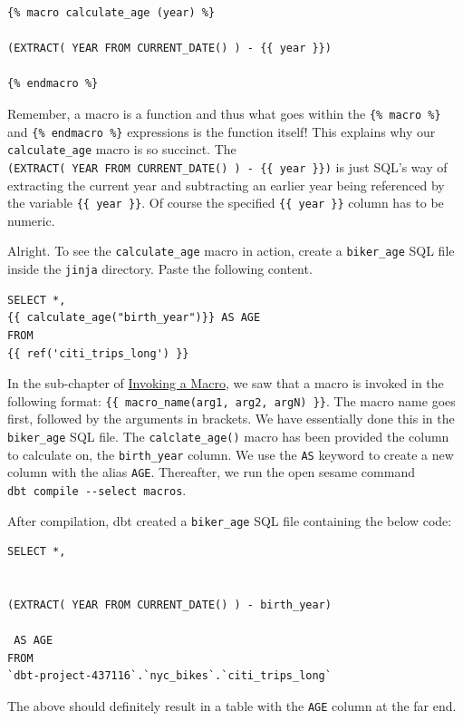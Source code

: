 \documentclass[
]{book}
\begin{document}
\begin{verbatim}
{% macro calculate_age (year) %}

(EXTRACT( YEAR FROM CURRENT_DATE() ) - {{ year }}) 

{% endmacro %}
\end{verbatim}

Remember, a macro is a function and thus what goes within the \texttt{\{\%\ macro\ \%\}} and \texttt{\{\%\ endmacro\ \%\}} expressions is the function itself! This explains why our \texttt{calculate\_age} macro is so succinct. The \texttt{(EXTRACT(\ YEAR\ FROM\ CURRENT\_DATE()\ )\ -\ \{\{\ year\ \}\})} is just SQL's way of extracting the current year and subtracting an earlier year being referenced by the variable \texttt{\{\{\ year\ \}\}}. Of course the specified \texttt{\{\{\ year\ \}\}} column has to be numeric.

Alright. To see the \texttt{calculate\_age} macro in action, create a \texttt{biker\_age} SQL file inside the \texttt{jinja} directory. Paste the following content.

\begin{verbatim}
SELECT *, 
{{ calculate_age("birth_year")}} AS AGE
FROM 
{{ ref('citi_trips_long') }}
\end{verbatim}

In the sub-chapter of \protect\hyperlink{ux5cux23Invokingux5cux2520aux5cux2520macro}{Invoking a Macro}, we saw that a macro is invoked in the following format: \texttt{\{\{\ macro\_name(arg1,\ arg2,\ argN)\ \}\}}. The macro name goes first, followed by the arguments in brackets. We have essentially done this in the \texttt{biker\_age} SQL file. The \texttt{calclate\_age()} macro has been provided the column to calculate on, the \texttt{birth\_year} column. We use the \texttt{AS} keyword to create a new column with the alias \texttt{AGE}. Thereafter, we run the open sesame command \texttt{dbt\ compile\ -\/-select\ macros}.

After compilation, dbt created a \texttt{biker\_age} SQL file containing the below code:

\begin{verbatim}
SELECT *, 


(EXTRACT( YEAR FROM CURRENT_DATE() ) - birth_year) 

 AS AGE
FROM 
`dbt-project-437116`.`nyc_bikes`.`citi_trips_long`
\end{verbatim}

The above should definitely result in a table with the \texttt{AGE} column at the far end.
\end{document}
